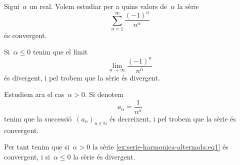 \documentclass[../analisi-matematica.tex]{subfiles}
\begin{document}
    \begin{example}
        \label{ex:serie-harmonica-alternada}
        Sigui~\(\alpha\) un real.
        Volem estudiar per a quins valors de~\(\alpha\) la sèrie
        \begin{equation}
            \label{ex:serie-harmonica-alternada:eq1}
            \sum_{n=1}^{\infty}\frac{(-1)^{n}}{n^{\alpha}}
        \end{equation}
        és convergent.
    \end{example}
    \begin{solution}
        Si~\(\alpha\leq0\) tenim que el límit
        \[
            \lim_{n\to\infty}\frac{(-1)^{n}}{n^{\alpha}}
        \]
        és divergent, i pel \corollari{}  trobem que la sèrie és divergent.

        Estudiem ara el cas~\(\alpha>0\).
        Si denotem
        \[
            a_{n}=\frac{1}{n^{\alpha}}
        \]
        tenim que la successió~\((a_{n})_{n\in\mathbb{N}}\) és decreixent, i pel  trobem que la sèrie és convergent.

        Per tant tenim que si~\(\alpha>0\) la sèrie \eqref{ex:serie-harmonica-alternada:eq1} és convergent, i si~\(\alpha\leq0\) la sèrie és divergent.
    \end{solution}
\end{document}

